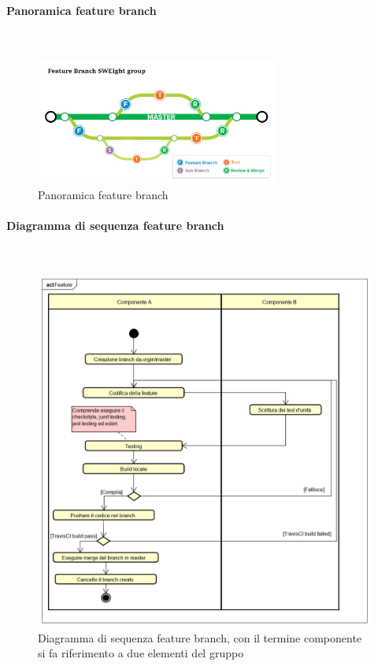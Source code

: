 \paragraph{Panoramica feature branch}\mbox{}\\ \label{sec:FB}

\begin{figure}[H]
\centering
\includegraphics[width=8cm,keepaspectratio]{img/pan-featurebranch.png}
\caption{Panoramica feature branch}
\end{figure}


\paragraph{Diagramma di sequenza feature branch}\mbox{}\\ \label{sec:DSFB}

\begin{figure}[H]
\centering
\includegraphics[width=12cm,keepaspectratio]{img/Feature.png}
\caption{Diagramma di sequenza feature branch, con il termine componente si fa riferimento a due elementi del gruppo}
\end{figure}



